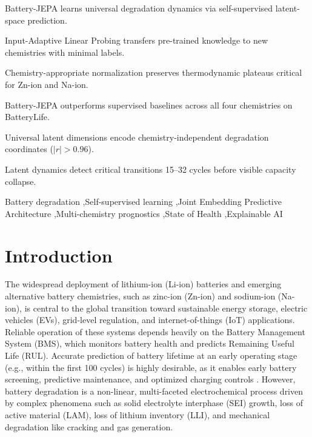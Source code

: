 \documentclass[a4paper,fleqn]{cas-dc}
\begin{document}
\begin{highlights}
\item Battery-JEPA learns universal degradation dynamics via self-supervised latent-space prediction.
\item Input-Adaptive Linear Probing transfers pre-trained knowledge to new chemistries with minimal labels.
\item Chemistry-appropriate normalization preserves thermodynamic plateaus critical for Zn-ion and Na-ion.
\item Battery-JEPA outperforms supervised baselines across all four chemistries on BatteryLife.
\item Universal latent dimensions encode chemistry-independent degradation coordinates ($|r| > 0.96$).
\item Latent dynamics detect critical transitions 15--32 cycles before visible capacity collapse.
\end{highlights}

\begin{keywords}
Battery degradation \sep Self-supervised learning \sep Joint Embedding Predictive Architecture \sep Multi-chemistry prognostics \sep State of Health \sep Explainable AI
\end{keywords}

\maketitle

\section{Introduction}
\label{sec:intro}

The widespread deployment of lithium-ion (Li-ion) batteries and emerging alternative battery chemistries, such as zinc-ion (Zn-ion) and sodium-ion (Na-ion), is central to the global transition toward sustainable energy storage, electric vehicles (EVs), grid-level regulation, and internet-of-things (IoT) applications. Reliable operation of these systems depends heavily on the Battery Management System (BMS), which monitors battery health and predicts Remaining Useful Life (RUL). Accurate prediction of battery lifetime at an early operating stage (e.g., within the first 100 cycles) is highly desirable, as it enables early battery screening, predictive maintenance, and optimized charging controls \cite{severson2019data, attia2020closed}. However, battery degradation is a non-linear, multi-faceted electrochemical process driven by complex phenomena such as solid electrolyte interphase (SEI) growth, loss of active material (LAM), loss of lithium inventory (LLI), and mechanical degradation like cracking and gas generation.
\end{document}
